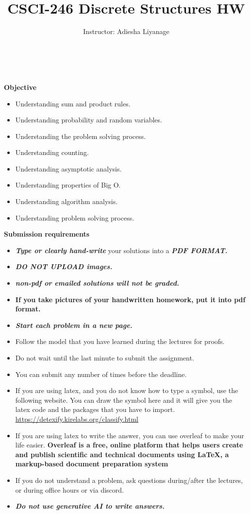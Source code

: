 \documentclass[12pt]{exam}
\title{CSCI-246 Discrete Structures HW \assignmentnumber}
\author{Instructor: Adiesha Liyanage}
\begin{document}
\maketitle

\hrulefill
\\
\\
\textbf{Objective}
\begin{itemize}
    \item Understanding sum and product rules.
    \item Understanding probability and random variables.
    \item Understanding the problem solving process.
    \item Understanding counting.
    \item Understanding asymptotic analysis.
    \item Understanding properties of Big O.
    \item Understanding algorithm analysis.
    \item Understanding problem solving process. 
\end{itemize}

\textbf{Submission requirements}
\begin{itemize}
    \item \textbf{\textit{Type or clearly hand-write}} your solutions into a \textbf{\textit{PDF FORMAT.}} 
    \item \textbf{\textit{DO NOT UPLOAD images.}}
    \item \textbf{\textit{non-pdf or emailed solutions will not be graded.}}
    \item \textbf{If you take pictures of your handwritten homework, put it into pdf format.}
    \item \textbf{\textit{Start each problem in a new page.}}
    \item Follow the model that you have learned during the lectures for proofs.
    \item Do not wait until the last minute to submit the assignment.
    \item You can submit any number of times before the deadline. 
    \item If you are using latex, and you do not know how to type a symbol, use the following website. You can draw the symbol here and it will give you the latex code and the packages that you have to import. \url{https://detexify.kirelabs.org/classify.html}
    \item If you are using latex to write the answer, you can use overleaf to make your life easier. \textbf{Overleaf is a free, online platform that helps users create and publish scientific and technical documents using LaTeX, a markup-based document preparation system}
    \item If you do not understand a problem, ask questions during/after the lectures, or during office hours or via discord.
    \item \textbf{\textit{Do not use generative AI to write answers.}} 
\end{itemize}
\end{document}
